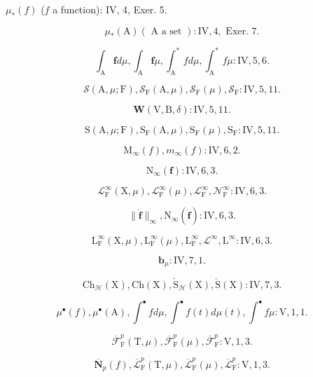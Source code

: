 \(\mu_{*}(f)\) (\(f\) a function): IV, 4, Exer. 5.

\[
\mu_ {*} (\mathrm{A}) (\text { A a set }): \mathrm{IV}, 4, \text { Exer. } 7.
\]

\[
\int_ {\mathrm{A}} \textbf {f} d \mu , \int_ {\mathrm{A}} \textbf {f} \mu , \int_ {\mathrm{A}} ^ {*} f d \mu , \int_ {\mathrm{A}} ^ {*} f \mu : \mathrm{IV}, 5, 6.
\]

\[
\mathcal {S} (\mathrm{A}, \mu ; \mathrm{F}), \mathcal {S} _ {\mathrm{F}} (\mathrm{A}, \mu), \mathcal {S} _ {\mathrm{F}} (\mu), \mathcal {S} _ {\mathrm{F}}: \mathrm{IV}, 5, 11.
\]

\[
\boldsymbol {W} (\mathrm{V}, \mathrm{B}, \delta): \mathrm{IV}, 5, 11.
\]

\[
\mathrm{S} (\mathrm{A}, \mu ; \mathrm{F}), \mathrm{S} _ {\mathrm{F}} (\mathrm{A}, \mu), \mathrm{S} _ {\mathrm{F}} (\mu), \mathrm{S} _ {\mathrm{F}}: \mathrm{IV}, 5, 11.
\]

\[
\mathrm{M} _ {\infty} (f), m _ {\infty} (f): \mathrm{IV}, 6, 2.
\]

\[
\mathrm{N} _ {\infty} (\mathbf {f}): \mathrm{IV}, 6, 3.
\]

\[
\mathcal {L} _ {\mathrm{F}} ^ {\infty} (\mathrm{X}, \mu), \mathcal {L} _ {\mathrm{F}} ^ {\infty} (\mu), \mathcal {L} _ {\mathrm{F}} ^ {\infty}, \mathcal {N} _ {\mathrm{F}} ^ {\infty}: \mathrm{IV}, 6, 3.
\]

\[
\| \dot {\mathbf {f}} \| _ {\infty}, \mathrm{N} _ {\infty} (\dot {\mathbf {f}}): \mathrm{IV}, 6, 3.
\]

\[
\mathrm{L} _ {\mathrm{F}} ^ {\infty} (\mathrm{X}, \mu), \mathrm{L} _ {\mathrm{F}} ^ {\infty} (\mu), \mathrm{L} _ {\mathrm{F}} ^ {\infty}, \mathcal {L} ^ {\infty}, \mathrm{L} ^ {\infty}: \mathrm{IV}, 6, 3.
\]

\[
\mathbf {b} _ {\mu}: \mathrm{IV}, 7, 1.
\]

\[
\mathrm{Ch} _ {\mathcal {H}} (\mathrm{X}), \mathrm{Ch} (\mathrm{X}), \check {\mathrm{S}} _ {\mathcal {H}} (\mathrm{X}), \check {\mathrm{S}} (\mathrm{X}): \mathrm{IV}, 7, 3.
\]

\[
\mu^ {\bullet} (f), \mu^ {\bullet} (\mathrm{A}), \int^ {\bullet} f d \mu , \int^ {\bullet} f (t) d \mu (t), \int^ {\bullet} f \mu : \mathrm{V}, 1, 1.
\]

\[
\overline {{\mathcal {F}}} _ {\mathrm{F}} ^ {p} (\mathrm{T}, \mu), \overline {{\mathcal {F}}} _ {\mathrm{F}} ^ {p} (\mu), \overline {{\mathcal {F}}} _ {\mathrm{F}} ^ {p}: \mathrm{V}, 1, 3.
\]

\[
\overline {{\mathbf {N}}} _ {p} (f), \overline {{\mathcal {L}}} _ {\mathrm{F}} ^ {p} (\mathrm{T}, \mu), \overline {{\mathcal {L}}} _ {\mathrm{F}} ^ {p} (\mu), \overline {{\mathcal {L}}} _ {\mathrm{F}} ^ {p}: \mathrm{V}, 1, 3.
\]

